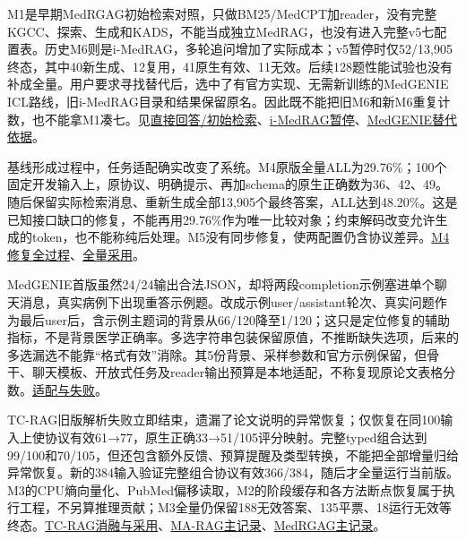 \documentclass[
  11pt,
  a4paper,
]{article}
\begin{document}
M1是早期MedRGAG初始检索对照，只做BM25/MedCPT加reader，没有完整KGCC、探索、生成和KADS，不能当成独立MedRAG，也没有进入完整v5七配置表。历史M6则是i-MedRAG，多轮追问增加了实际成本；v5暂停时仅52/13,905终态，其中40新生成、12复用，41原生有效、11无效。后续128题性能试验也没有补成全量。用户要求寻找替代后，选中了有官方实现、无需新训练的MedGENIE
ICL路线，旧i-MedRAG目录和结果保留原名。因此既不能把旧M6和新M6重复计数，也不能拿M1凑七。见\href{https://github.com/xiotakut/cf_mrg/blob/main/papers/2026-10-02_cf_moa/author_dossier/records/baselines/direct_retrieval.md}{直接回答/初始检索}、\href{https://github.com/xiotakut/cf_mrg/blob/main/papers/2026-10-02_cf_moa/author_dossier/records/baselines/imedrag.md\#L188}{i-MedRAG暂停}、\href{https://github.com/xiotakut/cf_mrg/blob/main/papers/2026-10-02_cf_moa/author_dossier/records/baselines/medgenie.md\#L22}{MedGENIE替代依据}。

基线形成过程中，任务适配确实改变了系统。M4原版全量ALL为29.76\%；100个固定开发输入上，原协议、明确提示、再加schema的原生正确数为36、42、49。随后保留实际检索消息、重新生成全部13,905个最终答案，ALL达到48.20\%。这是已知接口缺口的修复，不能再用29.76\%作为唯一比较对象；约束解码改变允许生成的token，也不能称纯后处理。M5没有同步修复，使两配置仍含协议差异。\href{https://github.com/xiotakut/cf_mrg/blob/main/papers/2026-10-02_cf_moa/author_dossier/records/baselines/medrag.md\#L214}{M4修复全过程}、\href{https://github.com/xiotakut/cf_mrg/blob/main/papers/2026-10-02_cf_moa/author_dossier/records/baselines/medrag.md\#L1286}{全量采用}。

MedGENIE首版虽然24/24输出合法JSON，却将两段completion示例塞进单个聊天消息，真实病例下出现重答示例题。改成示例user/assistant轮次、真实问题作为最后user后，含示例主题词的背景从66/120降至1/120；这只是定位修复的辅助指标，不是背景医学正确率。多选字符串包装保留原值，不推断缺失选项，后来的多选漏选不能靠``格式有效''消除。其5份背景、采样参数和官方示例保留，但骨干、聊天模板、开放式任务及reader输出预算是本地适配，不称复现原论文表格分数。\href{https://github.com/xiotakut/cf_mrg/blob/main/papers/2026-10-02_cf_moa/author_dossier/records/baselines/medgenie.md\#L82}{适配与失败}。

TC-RAG旧版解析失败立即结束，遗漏了论文说明的异常恢复；仅恢复在同100输入上使协议有效61→77，原生正确33→51/105评分映射。完整typed组合达到99/100和70/105，但还包含额外反馈、预算提醒及类型转换，不能把全部增量归给异常恢复。新的384输入验证完整组合协议有效366/384，随后才全量运行当前版。M3的CPU熵向量化、PubMed偏移读取，M2的阶段缓存和各方法断点恢复属于执行工程，不另算推理贡献；M3全量仍保留188无效答案、135平票、18运行无效等终态。\href{https://github.com/xiotakut/cf_mrg/blob/main/papers/2026-10-02_cf_moa/author_dossier/records/baselines/tcrag.md\#L494}{TC-RAG消融与采用}、\href{https://github.com/xiotakut/cf_mrg/blob/main/papers/2026-10-02_cf_moa/author_dossier/records/baselines/marag.md}{MA-RAG主记录}、\href{https://github.com/xiotakut/cf_mrg/blob/main/papers/2026-10-02_cf_moa/author_dossier/records/baselines/medrgag.md}{MedRGAG主记录}。
\end{document}
